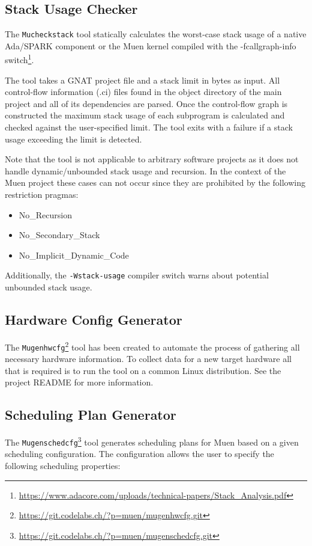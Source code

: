 \documentclass[a4paper,twoside,titlepage]{article}
\begin{document}
\subsection{Stack Usage Checker}
\label{sec:mucheckstack}
The \texttt{Mucheckstack} tool statically calculates the worst-case stack usage
of a native Ada/SPARK component or the Muen kernel compiled with the
-fcallgraph-info
switch\footnote{\url{https://www.adacore.com/uploads/technical-papers/Stack\_Analysis.pdf}}.

The tool takes a GNAT project file and a stack limit in bytes as input.  All
control-flow information (.ci) files found in the object directory of the main
project and all of its dependencies are parsed. Once the control-flow graph is
constructed the maximum stack usage of each subprogram is calculated and
checked against the user-specified limit. The tool exits with a failure if a
stack usage exceeding the limit is detected.

Note that the tool is not applicable to arbitrary software projects
as it does not handle dynamic/unbounded stack usage and recursion. In the
context of the Muen project these cases can not occur since they are prohibited
by the following restriction pragmas:
\begin{itemize}
	\item No\_Recursion
	\item No\_Secondary\_Stack
	\item No\_Implicit\_Dynamic\_Code
\end{itemize}

Additionally, the \texttt{-Wstack-usage} compiler switch warns about potential
unbounded stack usage.

\subsection{Hardware Config Generator}
\label{sec:mugenhwcfg}
The
\texttt{Mugenhwcfg}\footnote{\url{https://git.codelabs.ch/?p=muen/mugenhwcfg.git}}
tool has been created to automate the process of gathering all necessary
hardware information. To collect data for a new target hardware all that is
required is to run the tool on a common Linux distribution. See the project
README for more information.

\subsection{Scheduling Plan Generator}
\label{sec:mugenschedcfg}
The
\texttt{Mugenschedcfg}\footnote{\url{https://git.codelabs.ch/?p=muen/mugenschedcfg.git}}
tool generates scheduling plans for Muen based on a given scheduling
configuration.  The configuration allows the user to specify the following
scheduling properties:
\end{document}
